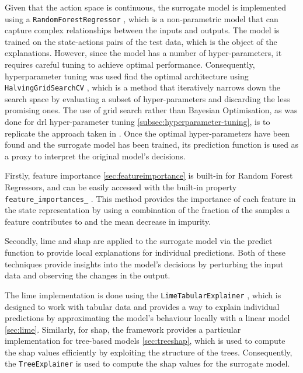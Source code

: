 Given that the action space is continuous, the surrogate model is implemented using a \texttt{RandomForestRegressor} \cite{sklearnRandomForest}, which is a non-parametric model that can capture complex relationships between the inputs and outputs. The model is trained on the state-actions pairs of the test data, which is the object of the explanations. However, since the model has a number of hyper-parameters, it requires careful tuning to achieve optimal performance. Consequently, hyperparameter tuning was used find the optimal architecture using \texttt{HalvingGridSearchCV} \cite{sklearnHalvingGridSearch}, which is a method that iteratively narrows down the search space by evaluating a subset of hyper-parameters and discarding the less promising ones. The use of grid search rather than Bayesian Optimisation, as was done for \acrshort{drl} hyper-parameter tuning \ref{subsec:hyperparameter-tuning}, is to replicate the approach taken in \cite{de-La-Rica-Escudero2025}. Once the optimal hyper-parameters have been found and the surrogate model has been trained, its prediction function is used as a proxy to interpret the original model's decisions.

Firstly, feature importance \ref{sec:featureimportance} is built-in for Random Forest Regressors, and can be easily accessed with the built-in property \texttt{feature\_importances\_} \cite{sklearnFeatureImportance}. This method provides the importance of each feature in the state representation by using a combination of the fraction of the samples a feature contributes to and the mean decrease in impurity.

Secondly, \acrshort{lime} and \acrshort{shap} are applied to the surrogate model via the predict function to provide local explanations for individual predictions. Both of these techniques provide insights into the model's decisions by perturbing the input data and observing the changes in the output. 

The \acrshort{lime} implementation is done using the \texttt{LimeTabularExplainer} \cite{LimeTabularExplainer}, which is designed to work with tabular data and provides a way to explain individual predictions by approximating the model's behaviour locally with a linear model \ref{sec:lime}. Similarly, for \acrshort{shap}, the framework provides a particular implementation for tree-based models \ref{sec:treeshap}, which is used to compute the \acrshort{shap} values efficiently by exploiting the structure of the trees. Consequently, the \texttt{TreeExplainer} \cite{ShapTreeExplainer} is used to compute the \acrshort{shap} values for the surrogate model.

